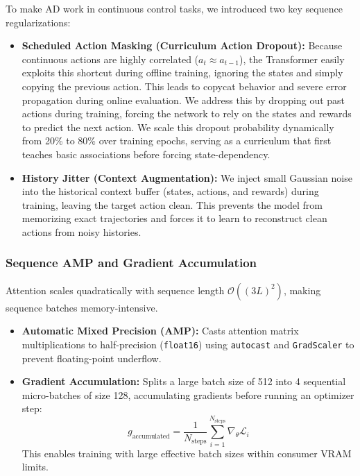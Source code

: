 \documentclass[11pt,a4paper]{article}
\begin{document}
To make AD work in continuous control tasks, we introduced two key sequence regularizations:
\begin{itemize}
    \item \textbf{Scheduled Action Masking (Curriculum Action Dropout):} Because continuous actions are highly correlated ($a_t \approx a_{t-1}$), the Transformer easily exploits this shortcut during offline training, ignoring the states and simply copying the previous action. This leads to copycat behavior and severe error propagation during online evaluation. We address this by dropping out past actions during training, forcing the network to rely on the states and rewards to predict the next action. We scale this dropout probability dynamically from 20\% to 80\% over training epochs, serving as a curriculum that first teaches basic associations before forcing state-dependency.
    \item \textbf{History Jitter (Context Augmentation):} We inject small Gaussian noise into the historical context buffer (states, actions, and rewards) during training, leaving the target action clean. This prevents the model from memorizing exact trajectories and forces it to learn to reconstruct clean actions from noisy histories.
\end{itemize}

\subsubsection{Sequence AMP and Gradient Accumulation}
Attention scales quadratically with sequence length $\mathcal{O}((3L)^2)$, making sequence batches memory-intensive. 
\begin{itemize}
    \item \textbf{Automatic Mixed Precision (AMP):} Casts attention matrix multiplications to half-precision (\texttt{float16}) using \texttt{autocast} and \texttt{GradScaler} to prevent floating-point underflow.
    \item \textbf{Gradient Accumulation:} Splits a large batch size of 512 into 4 sequential micro-batches of size 128, accumulating gradients before running an optimizer step:
    \begin{equation}
    g_{\text{accumulated}} = \frac{1}{N_{\text{steps}}} \sum_{i=1}^{N_{\text{steps}}} \nabla_{\theta} \mathcal{L}_i
    \end{equation}
    This enables training with large effective batch sizes within consumer VRAM limits.
\end{itemize}
\end{document}
